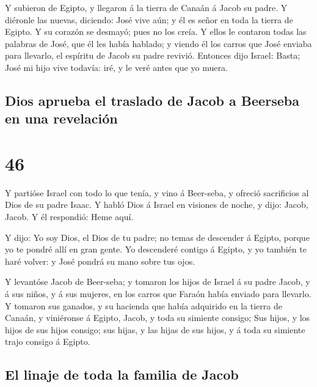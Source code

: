  Y subieron de Egipto, y llegaron á la tierra de Canaán á
Jacob su padre.  Y diéronle las nuevas, diciendo: José
vive aún; y él es señor en toda la tierra de Egipto. Y su corazón se
desmayó; pues no los creía.  Y ellos le contaron todas
las palabras de José, que él les había hablado; y viendo él los carros
que José enviaba para llevarlo, el espíritu de Jacob su padre revivió.
 Entonces dijo Israel: Basta; José mi hijo vive todavía:
iré, y le veré antes que yo muera.

\hypertarget{dios-aprueba-el-traslado-de-jacob-a-beerseba-en-una-revelaciuxf3n}{%
\subsection{Dios aprueba el traslado de Jacob a Beerseba en una
revelación}\label{dios-aprueba-el-traslado-de-jacob-a-beerseba-en-una-revelaciuxf3n}}

\hypertarget{section-45}{%
\section{46}\label{section-45}}

 Y partióse Israel con todo lo que tenía, y vino á
Beer-seba, y ofreció sacrificios al Dios de su padre Isaac.
 Y habló Dios á Israel en visiones de noche, y dijo:
Jacob, Jacob. Y él respondió: Heme aquí.

 Y dijo: Yo soy Dios, el Dios de tu padre; no temas de
descender á Egipto, porque yo te pondré allí en gran gente.
 Yo descenderé contigo á Egipto, y yo también te haré
volver: y José pondrá su mano sobre tus ojos.

 Y levantóse Jacob de Beer-seba; y tomaron los hijos de
Israel á su padre Jacob, y á sus niños, y á sus mujeres, en los carros
que Faraón había enviado para llevarlo.  Y tomaron sus
ganados, y su hacienda que había adquirido en la tierra de Canaán, y
viniéronse á Egipto, Jacob, y toda su simiente consigo; 
Sus hijos, y los hijos de sus hijos consigo; sus hijas, y las hijas de
sus hijos, y á toda su simiente trajo consigo á Egipto.

\hypertarget{el-linaje-de-toda-la-familia-de-jacob}{%
\subsection{El linaje de toda la familia de
Jacob}\label{el-linaje-de-toda-la-familia-de-jacob}}

